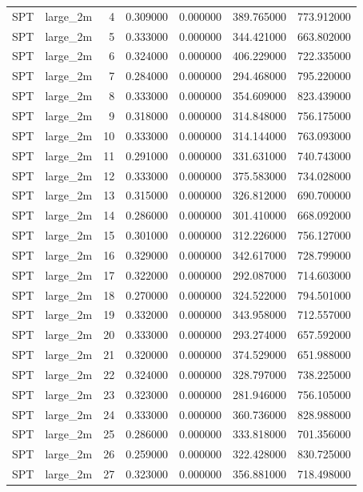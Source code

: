 \begin{tabular}{llrrrrr}
SPT & large_2m & 4 & 0.309000 & 0.000000 & 389.765000 & 773.912000 \\
SPT & large_2m & 5 & 0.333000 & 0.000000 & 344.421000 & 663.802000 \\
SPT & large_2m & 6 & 0.324000 & 0.000000 & 406.229000 & 722.335000 \\
SPT & large_2m & 7 & 0.284000 & 0.000000 & 294.468000 & 795.220000 \\
SPT & large_2m & 8 & 0.333000 & 0.000000 & 354.609000 & 823.439000 \\
SPT & large_2m & 9 & 0.318000 & 0.000000 & 314.848000 & 756.175000 \\
SPT & large_2m & 10 & 0.333000 & 0.000000 & 314.144000 & 763.093000 \\
SPT & large_2m & 11 & 0.291000 & 0.000000 & 331.631000 & 740.743000 \\
SPT & large_2m & 12 & 0.333000 & 0.000000 & 375.583000 & 734.028000 \\
SPT & large_2m & 13 & 0.315000 & 0.000000 & 326.812000 & 690.700000 \\
SPT & large_2m & 14 & 0.286000 & 0.000000 & 301.410000 & 668.092000 \\
SPT & large_2m & 15 & 0.301000 & 0.000000 & 312.226000 & 756.127000 \\
SPT & large_2m & 16 & 0.329000 & 0.000000 & 342.617000 & 728.799000 \\
SPT & large_2m & 17 & 0.322000 & 0.000000 & 292.087000 & 714.603000 \\
SPT & large_2m & 18 & 0.270000 & 0.000000 & 324.522000 & 794.501000 \\
SPT & large_2m & 19 & 0.332000 & 0.000000 & 343.958000 & 712.557000 \\
SPT & large_2m & 20 & 0.333000 & 0.000000 & 293.274000 & 657.592000 \\
SPT & large_2m & 21 & 0.320000 & 0.000000 & 374.529000 & 651.988000 \\
SPT & large_2m & 22 & 0.324000 & 0.000000 & 328.797000 & 738.225000 \\
SPT & large_2m & 23 & 0.323000 & 0.000000 & 281.946000 & 756.105000 \\
SPT & large_2m & 24 & 0.333000 & 0.000000 & 360.736000 & 828.988000 \\
SPT & large_2m & 25 & 0.286000 & 0.000000 & 333.818000 & 701.356000 \\
SPT & large_2m & 26 & 0.259000 & 0.000000 & 322.428000 & 830.725000 \\
SPT & large_2m & 27 & 0.323000 & 0.000000 & 356.881000 & 718.498000 \\

\end{tabular}

